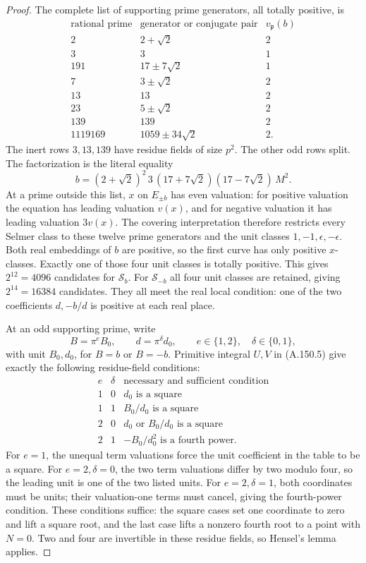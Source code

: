 \begin{proof}
The complete list of supporting prime generators, all
totally positive, is
\[
 \begin{array}{c|c|c}
 \text{rational prime}&\text{generator or conjugate pair}
                                      &v_{\mathfrak p}(b)\\ \hline
 2&2+\sqrt2&2\\
 3&3&1\\
 191&17\pm7\sqrt2&1\\
 7&3\pm\sqrt2&2\\
 13&13&2\\
 23&5\pm\sqrt2&2\\
 139&139&2\\
 1119169&1059\pm34\sqrt2&2 .
 \end{array}
\tag{A.150.22}
\]
The inert rows \(3,13,139\) have residue fields of size
\(p^2\).  The other odd rows split.
The factorization is the literal equality
\[
 b=(2+\sqrt2)^2\,3\,(17+7\sqrt2)(17-7\sqrt2)\,M^2.
\tag{A.150.23}
\]
At a prime outside this list, \(x\) on \(E_{\pm b}\)
has even valuation: for positive valuation the equation
has leading valuation \(v(x)\), and for negative valuation
it has leading valuation \(3v(x)\).
The covering interpretation therefore restricts every
Selmer class to these twelve prime generators and the
unit classes \(1,-1,\epsilon,-\epsilon\).
Both real embeddings of \(b\) are positive, so the
first curve has only positive \(x\)-classes.
Exactly one of those four unit classes is totally positive.
This gives \(2^{12}=4096\) candidates for \(\mathcal S_b\).
For \(\mathcal S_{-b}\) all four unit classes are retained,
giving \(2^{14}=16384\) candidates.
They all meet the real local condition: one of the two
coefficients \(d,-b/d\) is positive at each real place.

At an odd supporting prime, write
\[
                B=\pi^e B_0,\qquad
                d=\pi^\delta d_0,\qquad
                e\in\{1,2\},\quad\delta\in\{0,1\},
\]
with unit \(B_0,d_0\), for \(B=b\) or \(B=-b\).
Primitive integral \(U,V\) in (A.150.5) give exactly
the following residue-field conditions:
\[
 \begin{array}{c|c|l}
 e&\delta&\text{necessary and sufficient condition}\\ \hline
 1&0&d_0\text{ is a square}\\
 1&1&B_0/d_0\text{ is a square}\\
 2&0&d_0\text{ or }B_0/d_0\text{ is a square}\\
 2&1&-B_0/d_0^2\text{ is a fourth power}.
 \end{array}
\tag{A.150.24}
\]
For \(e=1\), the unequal term valuations force the
unit coefficient in the table to be a square.
For \(e=2,\delta=0\), the two term valuations differ
by two modulo four, so the leading unit is one of
the two listed units.
For \(e=2,\delta=1\), both coordinates must be units;
their valuation-one terms must cancel, giving the
fourth-power condition.
These conditions suffice: the square cases set one
coordinate to zero and lift a square root, and the
last case lifts a nonzero fourth root to a point
with \(N=0\).  Two and four are invertible in these
residue fields, so Hensel's lemma applies.


\end{proof}
